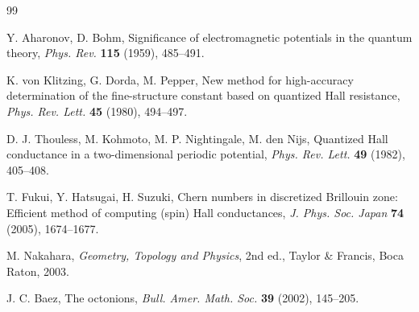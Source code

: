 \documentclass[11pt,a4paper]{article}
\theoremstyle{remark}
\begin{document}
	\begin{thebibliography}{99}
		
		Y. Aharonov, D. Bohm,
		Significance of electromagnetic potentials in the quantum theory,
		\emph{Phys. Rev.} \textbf{115} (1959), 485--491.
		
		K. von Klitzing, G. Dorda, M. Pepper,
		New method for high-accuracy determination of the fine-structure constant based on quantized Hall resistance,
		\emph{Phys. Rev. Lett.} \textbf{45} (1980), 494--497.
		
		D. J. Thouless, M. Kohmoto, M. P. Nightingale, M. den Nijs,
		Quantized Hall conductance in a two-dimensional periodic potential,
		\emph{Phys. Rev. Lett.} \textbf{49} (1982), 405--408.
		
		T. Fukui, Y. Hatsugai, H. Suzuki,
		Chern numbers in discretized Brillouin zone: Efficient method of computing (spin) Hall conductances,
		\emph{J. Phys. Soc. Japan} \textbf{74} (2005), 1674--1677.
		
		M. Nakahara,
		\emph{Geometry, Topology and Physics},
		2nd ed., Taylor \& Francis, Boca Raton, 2003.
		
		J. C. Baez,
		The octonions,
		\emph{Bull. Amer. Math. Soc.} \textbf{39} (2002), 145--205.
		
	\end{thebibliography}
	
\end{document}
